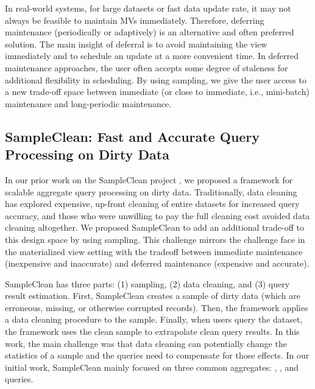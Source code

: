 In real-world systems, for large datasets or fast data update rate, it may not always be feasible to maintain MVs immediately. 
Therefore, deferring maintenance (periodically or adaptively) is an alternative and often preferred solution.
The main insight of deferral is to avoid maintaining the view immediately and to schedule an update at a more convenient time.
In deferred maintenance approaches, the user often accepts some degree of staleness for additional flexibility in scheduling.
By using sampling, we give the user access to a new trade-off space between immediate (or close to immediate, i.e., mini-batch) maintenance and long-periodic maintenance.

\fi


\subsection{SampleClean: Fast and Accurate Query Processing on Dirty Data}
In our prior work on the SampleClean project \cite{wang1999sample}, we proposed a framework for scalable aggregate query processing on dirty data.
Traditionally, data cleaning has explored expensive, up-front cleaning of entire datasets for increased query accuracy, and those who were unwilling to pay the full cleaning cost avoided data cleaning altogether.
We proposed SampleClean to add an additional trade-off to this design space by using sampling.
This challenge mirrors the challenge face in the materialized view setting with the tradeoff between immediate maintenance (inexpensive and inaccurate) and deferred maintenance (expensive and accurate).

SampleClean has three parts: (1) sampling, (2) data cleaning, and (3) query result estimation.
First, SampleClean creates a sample of dirty data (which are erroneous, missing, or otherwise corrupted records).
Then, the framework applies a data cleaning procedure to the sample.
Finally, when users query the dataset, the framework uses the clean sample to extrapolate clean query results.
In this work, the main challenge was that data cleaning can potentially change the statistics of a sample and the queries need to compensate for those effects.
In our initial work, SampleClean mainly focused on three common aggregates: \sumfunc, \avgfunc, and \countfunc queries.

